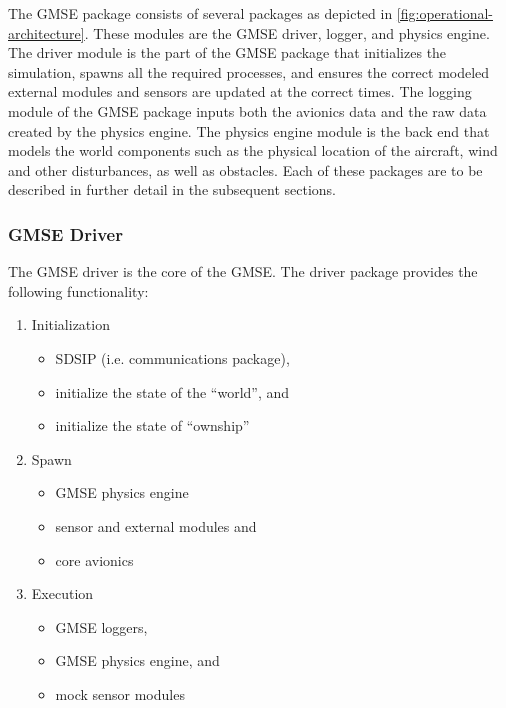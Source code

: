 The GMSE package consists of several packages as depicted in \autoref{fig:operational-architecture}.
These modules are the GMSE driver, logger, and physics engine. The driver module is the part of the
GMSE package that initializes the simulation, spawns all the required processes, and ensures the
correct modeled external modules and sensors are updated at the correct times. The logging module of
the GMSE package inputs both the avionics data and the raw data created by the physics engine. The
physics engine module is the back end that models the world components such as the physical location
of the aircraft, wind and other disturbances, as well as obstacles. Each of these packages are to be
described in further detail in the subsequent sections.

\subsubsection{GMSE Driver}

The GMSE driver is the core of the GMSE. The driver package provides the following functionality:

\begin{enumerate}
  \item Initialization
    \begin{itemize}
      \item SDSIP (i.e. communications package),
      \item initialize the state of the ``world'', and
      \item initialize the state of ``ownship''
    \end{itemize}
  \item Spawn
  \begin{itemize}
    \item GMSE physics engine
    \item sensor and external modules and
    \item core avionics
  \end{itemize}
  \item Execution
    \begin{itemize}
      \item GMSE loggers,
      \item GMSE physics engine, and
      \item mock sensor modules
    \end{itemize}
\end{enumerate}

